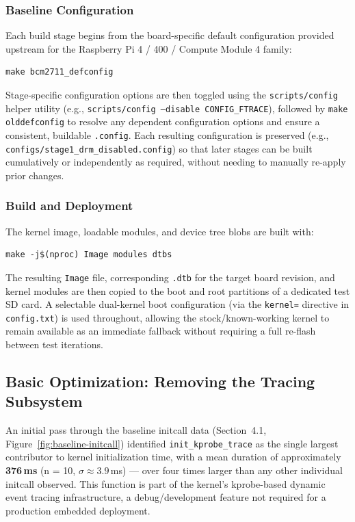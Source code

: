 \documentclass[11pt,a4paper]{article}
\begin{document}
\subsubsection*{Baseline Configuration}
Each build stage begins from the board-specific default configuration provided upstream for the Raspberry Pi 4 / 400 / Compute Module 4 family:
\begin{lstlisting}
make bcm2711_defconfig
\end{lstlisting}
Stage-specific configuration options are then toggled using the \texttt{scripts/config} helper utility (e.g., \texttt{scripts/config --disable CONFIG\_FTRACE}), followed by \texttt{make olddefconfig} to resolve any dependent configuration options and ensure a consistent, buildable \texttt{.config}. Each resulting configuration is preserved (e.g., \texttt{configs/stage1\_drm\_disabled.config}) so that later stages can be built cumulatively or independently as required, without needing to manually re-apply prior changes.
 
\subsubsection*{Build and Deployment}
The kernel image, loadable modules, and device tree blobs are built with:
\begin{lstlisting}
make -j$(nproc) Image modules dtbs
\end{lstlisting}
The resulting \texttt{Image} file, corresponding \texttt{.dtb} for the target board revision, and kernel modules are then copied to the boot and root partitions of a dedicated test SD card. A selectable dual-kernel boot configuration (via the \texttt{kernel=} directive in \texttt{config.txt}) is used throughout, allowing the stock/known-working kernel to remain available as an immediate fallback without requiring a full re-flash between test iterations.

\subsection{Basic Optimization: Removing the Tracing Subsystem}

An initial pass through the baseline initcall data (Section~4.1, Figure~\ref{fig:baseline-initcall}) identified \texttt{init\_kprobe\_trace} as the single largest contributor to kernel initialization time, with a mean duration of approximately \textbf{376\,ms} (n = 10, $\sigma \approx 3.9$\,ms) — over four times larger than any other individual initcall observed. This function is part of the kernel's kprobe-based dynamic event tracing infrastructure, a debug/development feature not required for a production embedded deployment.
\end{document}
